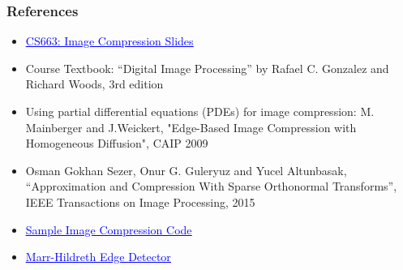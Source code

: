 \documentclass[Serif, 10pt, brown]{beamer}
\theoremstyle{example}
\theoremstyle{plain}
\begin{document}
\begin{frame}
	\frametitle{References}
	\begin{itemize}
		\item \href{https://docs.google.com/presentation/d/1-8xCg7o8Vtc9ghJf6y1Nkq9-TV0qSNfX/edit?usp=sharing&ouid=115909013767952805958&rtpof=true&sd=true}{\textcolor{blue}{\underline{CS663: Image Compression Slides}}}
		\item Course Textbook: ``Digital Image Processing'' by Rafael C. Gonzalez and Richard Woods, 3rd edition
		\item Using partial differential equations (PDEs) for image compression: M. Mainberger and J.Weickert, "Edge-Based Image Compression with Homogeneous Diffusion", CAIP 2009
		\item Osman Gokhan Sezer, Onur G. Guleryuz and Yucel Altunbasak, ``Approximation and Compression With Sparse Orthonormal Transforms'', IEEE Transactions on Image Processing, 2015
		\item \href{https://github.com/jeremyfell/image-compression/blob/master/image-compression.py}{\textcolor{blue}{\underline{Sample Image Compression Code}}}
		\item \href{https://github.com/adl1995/edge-detectors/blob/master/marr-hildreth-edge.py}{\textcolor{blue}{\underline{Marr-Hildreth Edge Detector}}}
	\end{itemize}
\end{frame}
\end{document}

